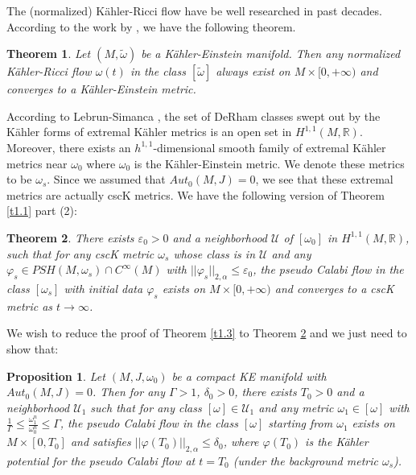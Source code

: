 \documentclass[11pt]{amsart}
\newtheorem{thm}{Theorem}[section]
\newtheorem{prop}[lem]{Proposition}
\numberwithin{equation}{section}
\newcommand{\bR}{ \mathbb{R}} %
\newcommand \eps{\varepsilon}
\begin{document}
\noindent
The (normalized) K\"ahler-Ricci flow have be well researched in past decades. According to the work by \cite{Cao1985} \cite{TiZh2011}, we have the following theorem. \\ 

\begin{thm}\label{TMCT}
	Let $(M,\tilde\omega)$ be a K\"ahler-Einstein manifold. Then any normalized K\"ahler-Ricci flow $\omega(t)$ in the class $[\tilde\omega]$ always exist on $M\times [0,+\infty)$ and converges to a K\"ahler-Einstein metric. \\  
	\end{thm}

According to Lebrun-Simanca \cite{Lesi1994},  the set of DeRham classes swept out by the K\"ahler forms of extremal K\"ahler metrics is an open set in $H^{1,1}(M,\bR)$.  Moreover,  there exists an $h^{1,1}$-dimensional smooth family of extremal K\"ahler metrics near $\omega_0$ where $\omega_0$ is the K\"ahler-Einstein metric.  We denote these metrics to be $\omega_s$.  Since we assumed that $Aut_0(M,J)=0$,  we see that these extremal metrics are actually cscK metrics.  We have the following version of 
Theorem \ref{t1.1} part (2):
\begin{thm}\label{t6.2N}
There exists $\eps_0>0$ and a neighborhood $\mathcal{U}$ of $[\omega_0]$ in $H^{1,1}(M,\bR)$,  such that for any cscK metric $\omega_s$ whose class is in $\mathcal{U}$ and any $\varphi_s\in PSH(M,\omega_s)\cap C^{\infty}(M)$ with $||\varphi_s||_{2,\alpha}\le \eps_0$,  the pseudo Calabi flow in the class $[\omega_s]$ with initial data $\varphi_s$ exists on $M\times [0,+\infty)$ and converges to a cscK metric as $t\rightarrow \infty$.
\end{thm}
We wish to reduce the proof of Theorem \ref{t1.3} to Theorem \ref{t6.2N} and we just need to show that:
\begin{prop}\label{p6.2}
Let $(M,J,\omega_0)$ be a compact KE manifold with $Aut_0(M,J)=0$.  Then for any $\Gamma>1$,  $\delta_0>0$,  there exists $T_0>0$ and a neighborhood $\mathcal{U}_1$ such that for any class $[\omega]\in \mathcal{U}_1$ and any metric $\omega_1\in [\omega]$ with $\frac{1}{\Gamma}\le \frac{\omega_1^n}{\omega_0^n}\le \Gamma$,  the pseudo Calabi flow in the class $[\omega]$ starting from $\omega_1$ exists on $M\times[0,T_0]$ and satisfies $||\varphi(T_0)||_{2,\alpha}\le \delta_0$,  where $\varphi(T_0)$ is the K\"ahler potential for the pseudo Calabi flow at $t=T_0$ (under the background metric $\omega_s$).  
\end{prop}
\end{document}
